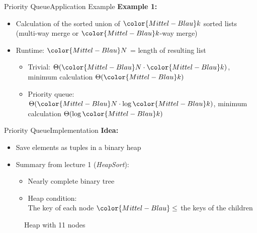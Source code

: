 \begin{frame}{Priority Queue}{Application Example}
  \textbf{Example 1:}
  \begin{itemize}
    \item
      Calculation of the sorted union of ${\color{Mittel-Blau}k}$ sorted lists\\
      (multi-way merge or ${\color{Mittel-Blau}k}$-way merge)
    \item
      Runtime:
      ${\color{Mittel-Blau}N}$ = length of resulting list
      \begin{itemize}
        \item
          Trivial:
          \begin{math}
            \Theta({\color{Mittel-Blau}N} \cdot {\color{Mittel-Blau}k})
          \end{math},
          minimum calculation $\Theta({\color{Mittel-Blau}k})$
        \item
          Priority queue:
          \begin{math}
            \Theta({\color{Mittel-Blau}N} \cdot \log {\color{Mittel-Blau}k})
          \end{math},
          minimum calculation  $\Theta(\log {\color{Mittel-Blau}k})$
      \end{itemize}
    \end{itemize}
\end{frame}


\begin{frame}{Priority Queue}{Implementation}
  \textbf{Idea:}
  \begin{itemize}
    \item
      Save elements as tuples in a binary heap
    \item
      Summary from lecture 1 (\textit{HeapSort}):
    \begin{itemize}
      \item
        Nearly complete binary tree
      \item
        {\color{Mittel-Blau}Heap condition}:\\
        The key of each node ${\color{Mittel-Blau}\leq}$ the keys of the
        children\\
    \end{itemize}
  \end{itemize}
  \vspace{-0.5em}
  \begin{figure}[!h]
    \begin{adjustbox}{height=0.3\linewidth}
    \end{adjustbox}
    \vspace{-0.75em}
    \caption{Heap with 11 nodes}%
    \label{fig:priority_queue:impl_heap}%
  \end{figure}
\end{frame}

